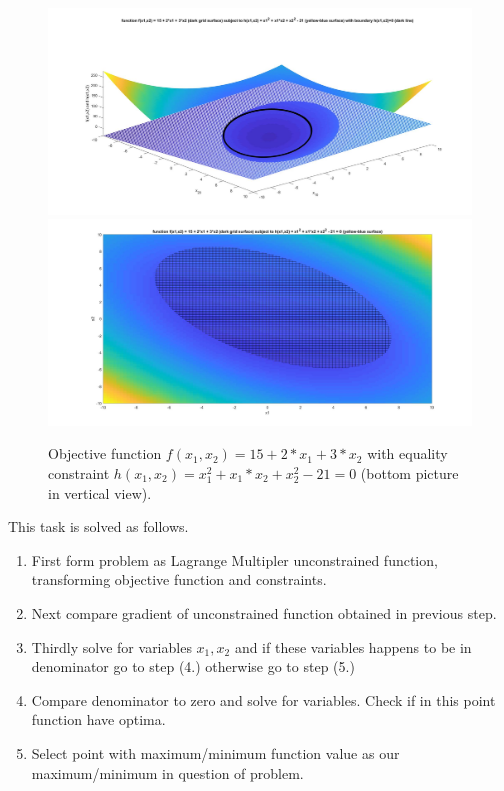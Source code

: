 \documentclass[main.tex]{subfiles}
\begin{document}
\begin{figure}[H]
\label{fig:lagrangeFigsIntro}
\centering
\includegraphics[width=\textwidth]{LagrangeMultiplerMethod/LagrangeMethod.jpg}
\includegraphics[width=\textwidth]{LagrangeMultiplerMethod/LagrangeMethod_view(0,90).jpg}
\caption{Objective function $f(x_1,x_2) = 15 + 2*x_1 + 3*x_2$ with equality constraint $h(x_1,x_2) = x^2_1 + x_1*x_2 + x_2^2 - 21 = 0$ (bottom picture in vertical view).}
\end{figure}

This task is solved as follows. 
\begin{enumerate}
    \item First form problem as Lagrange Multipler unconstrained function, transforming objective function and constraints.
    \item Next compare gradient of unconstrained function obtained in previous step.
    \item Thirdly solve for variables $x_1, x_2$ and if these variables happens to be in denominator go to step (4.) otherwise go to step (5.)
    \item Compare denominator to zero and solve for variables. Check if in this point function have optima.
    \item Select point with maximum/minimum function value as our maximum/minimum in question of problem. 
\end{enumerate}
\end{document}
